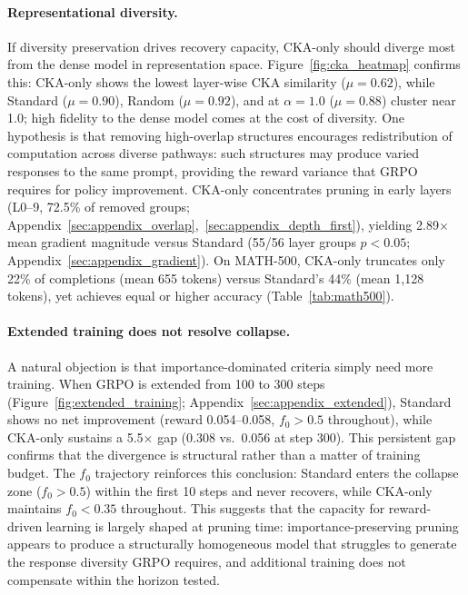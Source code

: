 \paragraph{Representational diversity.}
If diversity preservation drives recovery capacity, CKA-only should diverge most from the dense model in representation space.
Figure~\ref{fig:cka_heatmap} confirms this: CKA-only shows the lowest layer-wise CKA similarity ($\mu{=}0.62$), while Standard ($\mu{=}0.90$), Random ($\mu{=}0.92$), and \rasp{} at $\alpha{=}1.0$ ($\mu{=}0.88$) cluster near 1.0; high fidelity to the dense model comes at the cost of diversity.
One hypothesis is that removing high-overlap structures encourages redistribution of computation across diverse pathways: such structures may produce varied responses to the same prompt, providing the reward variance that GRPO requires for policy improvement.
CKA-only concentrates pruning in early layers (L0--9, 72.5\% of removed groups; Appendix~\ref{sec:appendix_overlap},~\ref{sec:appendix_depth_first}), yielding 2.89$\times$ mean gradient magnitude versus Standard (55/56 layer groups $p{<}0.05$; Appendix~\ref{sec:appendix_gradient}).
On MATH-500, CKA-only truncates only 22\% of completions (mean 655 tokens) versus Standard's 44\% (mean 1{,}128 tokens), yet achieves equal or higher accuracy (Table~\ref{tab:math500}).

\paragraph{Extended training does not resolve collapse.}
A natural objection is that importance-dominated criteria simply need more training.
When GRPO is extended from 100 to 300 steps (Figure~\ref{fig:extended_training}; Appendix~\ref{sec:appendix_extended}), Standard shows no net improvement (reward 0.054--0.058, $f_0 > 0.5$ throughout), while CKA-only sustains a 5.5$\times$ gap (0.308 vs.\ 0.056 at step 300). This persistent gap confirms that the divergence is structural rather than a matter of training budget.
The $f_0$ trajectory reinforces this conclusion: Standard enters the collapse zone ($f_0 > 0.5$) within the first 10 steps and never recovers, while CKA-only maintains $f_0 < 0.35$ throughout.
This suggests that the capacity for reward-driven learning is largely shaped at pruning time: importance-preserving pruning appears to produce a structurally homogeneous model that struggles to generate the response diversity GRPO requires, and additional training does not compensate within the horizon tested.

